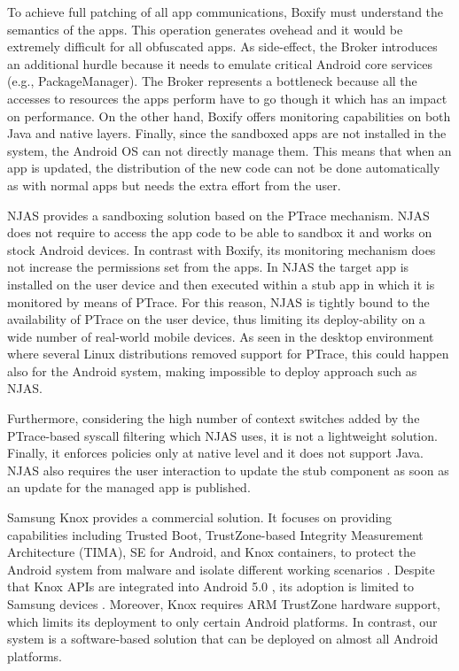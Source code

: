To achieve full patching of all app communications, Boxify must understand the semantics of the apps. This operation generates ovehead and it would be extremely difficult for all obfuscated apps. As side-effect, the Broker introduces an additional hurdle because it needs to emulate critical Android core services (e.g., PackageManager).  
The Broker represents a bottleneck because all the accesses to resources the apps perform have to go though it which has an impact on performance. On the other hand, Boxify offers monitoring capabilities on both Java and native layers. Finally, since the sandboxed apps are not installed in the system, the Android OS can not directly manage them. This means that when an app is updated, the distribution of the new code can not be done automatically as with normal apps but needs the extra effort from the user.

NJAS provides a sandboxing solution based on the PTrace mechanism. NJAS does not require to access the app code to be able to sandbox it and works on stock Android devices. In contrast with Boxify, its monitoring mechanism does not increase the permissions set from the apps. In NJAS the target app is installed on the user device and then executed within a stub app in which it is monitored by means of PTrace. For this reason, NJAS is tightly bound to the availability of PTrace on the user device, thus limiting its deploy-ability on a wide number of real-world mobile devices. As seen in the desktop environment where several Linux distributions removed support for PTrace, this could happen also for the Android system, making impossible to deploy approach such as NJAS.
 
Furthermore, considering the high number of context switches added by the PTrace-based syscall filtering which NJAS uses, it is not a lightweight solution. Finally, it enforces policies only at native level and it does not support Java. NJAS also
requires the user interaction to update the stub component as soon as an update for the managed app is published. 

Samsung Knox  provides a commercial solution. It focuses on providing capabilities including Trusted Boot, TrustZone-based Integrity Measurement Architecture (TIMA), SE for Android, and Knox containers, to protect the Android system from malware and isolate different working scenarios \cite{knox}. Despite that Knox APIs are integrated into Android 5.0 \cite{knox1}, its adoption is limited to Samsung devices \cite{knox2}. Moreover, Knox requires ARM TrustZone hardware support, which limits its deployment to only certain Android platforms.  In contrast, our \asd system is a software-based solution that can be deployed on almost all Android platforms. 

